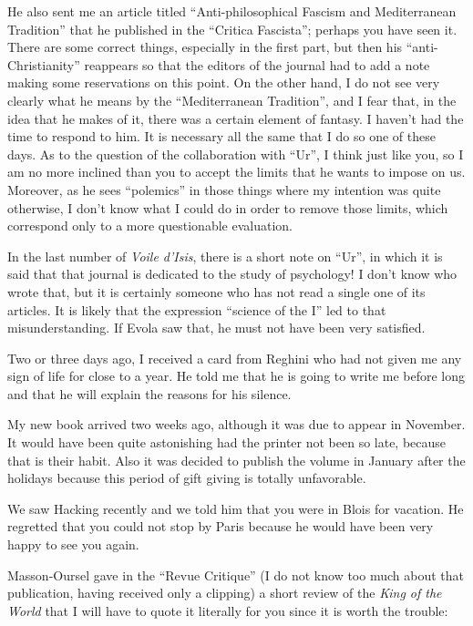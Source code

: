 He also sent me an article titled ``Anti-philosophical Fascism and Mediterranean Tradition'' that he published in the ``Critica Fascista''; perhaps you have seen it. There are some correct things, especially in the first part, but then his ``anti-Christianity'' reappears so that the editors of the journal had to add a note making some reservations on this point. On the other hand, I do not see very clearly what he means by the ``Mediterranean Tradition'', and I fear that, in the idea that he makes of it, there was a certain element of fantasy. I haven't had the time to respond to him. It is necessary all the same that I do so one of these days. As to the question of the collaboration with ``Ur'', I think just like you, so I am no more inclined than you to accept the limits that he wants to impose on us. Moreover, as he sees ``polemics'' in those things where my intention was quite otherwise, I don't know what I could do in order to remove those limits, which correspond only to a more questionable evaluation.

In the last number of \emph{Voile d'Isis}, there is a short note on ``Ur'', in which it is said that that journal is dedicated to the study of psychology! I don't know who wrote that, but it is certainly someone who has not read a single one of its articles. It is likely that the expression ``science of the I'' led to that misunderstanding. If Evola saw that, he must not have been very satisfied.

Two or three days ago, I received a card from Reghini who had not given me any sign of life for close to a year. He told me that he is going to write me before long and that he will explain the reasons for his silence.

My new book arrived two weeks ago, although it was due to appear in November. It would have been quite astonishing had the printer not been so late, because that is their habit. Also it was decided to publish the volume in January after the holidays because this period of gift giving is totally unfavorable.

We saw Hacking recently and we told him that you were in Blois for vacation. He regretted that you could not stop by Paris because he would have been very happy to see you again.

Masson-Oursel gave in the ``Revue Critique'' (I do not know too much about that publication, having received only a clipping) a short review of the \emph{King of the World} that I will have to quote it literally for you since it is worth the trouble:

